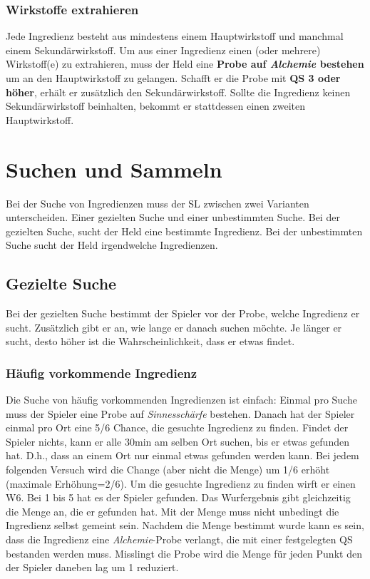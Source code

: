 \subsubsection{Wirkstoffe extrahieren}
\label{chap:wirkstoffgewinnung}
Jede Ingredienz besteht aus mindestens einem Hauptwirkstoff und manchmal einem Sekundärwirkstoff. Um aus einer Ingredienz einen (oder mehrere) Wirkstoff(e) zu extrahieren, muss der Held eine \textbf{Probe auf \textit{Alchemie} bestehen} um an den Hauptwirkstoff zu gelangen. Schafft er die Probe mit \textbf{QS 3 oder höher}, erhält er zusätzlich den Sekundärwirkstoff. Sollte die Ingredienz keinen Sekundärwirkstoff beinhalten, bekommt er stattdessen einen zweiten Hauptwirkstoff. 


\section{Suchen und Sammeln}
Bei der Suche von Ingredienzen muss der SL zwischen zwei Varianten unterscheiden. Einer gezielten Suche und einer unbestimmten Suche. Bei der gezielten Suche, sucht der Held eine bestimmte Ingredienz. Bei der unbestimmten Suche sucht der Held irgendwelche Ingredienzen.

\subsection{Gezielte Suche}
Bei der gezielten Suche bestimmt der Spieler vor der Probe, welche Ingredienz er sucht. Zusätzlich gibt er an, wie lange er danach suchen möchte. Je länger er sucht, desto höher ist die Wahrscheinlichkeit, dass er etwas findet. 

\subsubsection{Häufig vorkommende Ingredienz}
Die Suche von häufig vorkommenden Ingredienzen ist einfach: Einmal pro Suche muss der Spieler eine Probe auf \textit{Sinnesschärfe} bestehen. Danach hat der Spieler einmal pro Ort eine 5/6 Chance, die gesuchte Ingredienz zu finden. Findet der Spieler nichts, kann er alle 30min am selben Ort suchen, bis er etwas gefunden hat. D.h., dass an einem Ort nur einmal etwas gefunden werden kann. Bei jedem folgenden Versuch wird die Change (aber nicht die Menge) um 1/6 erhöht (maximale Erhöhung=2/6). Um die gesuchte Ingredienz zu finden wirft er einen W6. Bei 1 bis 5 hat es der Spieler gefunden. Das Wurfergebnis gibt gleichzeitig die Menge an, die er gefunden hat. Mit der Menge muss nicht unbedingt die Ingredienz selbst gemeint sein. Nachdem die Menge bestimmt wurde kann es sein, dass die Ingredienz eine \textit{Alchemie}-Probe verlangt, die mit einer festgelegten QS bestanden werden muss. Misslingt die Probe wird die Menge für jeden Punkt den der Spieler daneben lag um 1 reduziert.

